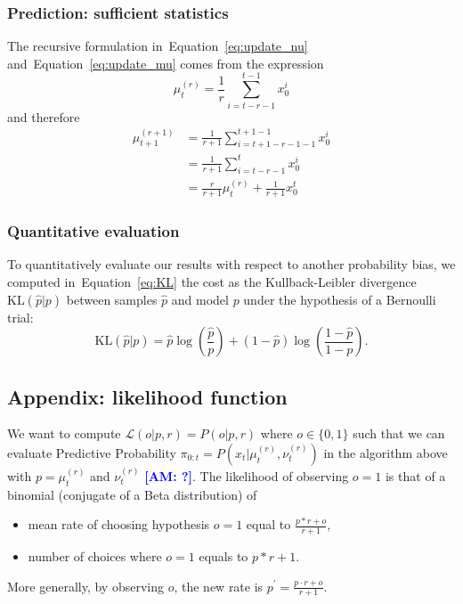 \documentclass[12pt,english]{article}%
\newcommand{\KL}[2]{\text{KL}( #1 | #2 )}
\newcommand{\pa}[1]{\left( #1 \right)}
\newcommand{\eq}[1]{\begin{equation*}#1\end{equation*}}
\newcommand{\eqs}[1]{\begin{align*}#1\end{align*}}
\newcommand{\Ll}{\mathcal{L}}
\newcommand{\seeEq}[1]{Equation~\ref{eq:#1}}
\newcommand{\seeApp}[1]{Appendix~\ref{app:#1}}
\newcommand{\AM}[1]{\textbf{\textcolor{blue}{[AM: #1]}}}
\begin{document}
\subsubsection{Prediction: sufficient statistics}

The recursive formulation in~\seeEq{update_nu} and~\seeEq{update_mu} comes from the expression
\eq{
\mu^{(r)}_{t} = \frac 1 r \sum_{i=t-r-1}^{t-1} x_0^i
}
and therefore
\eqs{
\mu^{(r+1)}_{t+1} 	&= \frac{1}{r+1} \sum_{i=t+1-r-1-1}^{t+1-1} x_0^i \\
					&= \frac{1}{r+1} \sum_{i=t-r-1}^{t} x_0^i \\
					&= \frac{r}{r+1} \mu^{(r)}_{t} + \frac{1}{r+1} x_0^t
}

%
%

\subsubsection{Quantitative evaluation}

To quantitatively evaluate our results with respect to another probability bias, we computed in~\seeEq{KL} the cost as the Kullback-Leibler divergence  $\KL{\hat p}{p}$ between samples $\hat p$ and model $p$ under the hypothesis of a Bernoulli trial:
\begin{equation}
\KL{\hat p}{p} = \hat{p} \log\pa{\frac{\hat p}{p}} + (1-\hat p) \log\pa{\frac{1-\hat p}{1-p}}.
\end{equation}


\subsection{Appendix: likelihood function}
\label{app:likelihood}


We want to compute $\Ll(o| p, r) = P(o | p, r)$ where $o \in \{ 0, 1 \}$ such that we can evaluate Predictive Probability $\pi_{0:t} = P(x_t |\mu^{(r)}_t,\nu^{(r)}_t)$ in the algorithm above with $p=\mu^{(r)}_t$ and $\nu^{(r)}_t$ \AM{?}.
The likelihood of observing $o=1$ is that of a binomial (conjugate of a Beta distribution) of
	\begin{itemize}
		\item  mean rate of choosing hypothesis $o=1$ equal to $\frac{p*r + o}{r+1}$,
		\item number of choices where  $o=1$ equals to $p*r+1$.
	\end{itemize}
More generally, by observing $o$, the new rate is $p^{'} = \frac{p\cdot r + o}{r+1}$.
\end{document}
